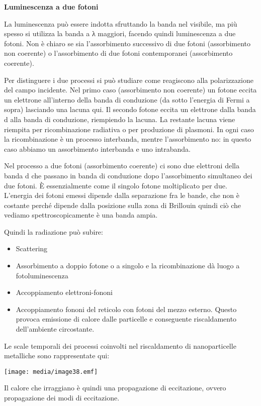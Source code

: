 \textbf{Luminescenza a due fotoni}

La luminescenza può essere indotta sfruttando la banda nel visibile, ma
più spesso si utilizza la banda a λ maggiori, facendo quindi
luminescenza a due fotoni. Non è chiaro se sia l'assorbimento successivo
di due fotoni (assorbimento non coerente) o l'assorbimento di due fotoni
contemporanei (assorbimento coerente).

Per distinguere i due processi si può studiare come reagiscono alla
polarizzazione del campo incidente. Nel primo caso (assorbimento non
coerente) un fotone eccita un elettrone all'interno della banda di
conduzione (da sotto l'energia di Fermi a sopra) lasciando una lacuna
qui. Il secondo fotone eccita un elettrone dalla banda d alla banda di
conduzione, riempiendo la lacuna. La restante lacuna viene riempita per
ricombinazione radiativa o per produzione di plasmoni. In ogni caso la
ricombinazione è un processo interbanda, mentre l'assorbimento no: in
questo caso abbiamo un assorbimento interbanda e uno intrabanda.

Nel processo a due fotoni (assorbimento coerente) ci sono due elettroni
della banda d che passano in banda di conduzione dopo l'assorbimento
simultaneo dei due fotoni. È essenzialmente come il singolo fotone
moltiplicato per due. L'energia dei fotoni emessi dipende dalla
separazione fra le bande, che non è costante perché dipende dalla
posizione sulla zona di Brillouin quindi ciò che vediamo
spettroscopicamente è una banda ampia.

Quindi la radiazione può subire:

\begin{itemize}
\item
  Scattering
\item
  Assorbimento a doppio fotone o a singolo e la ricombinazione dà luogo
  a fotoluminescenza
\item
  Accoppiamento elettroni-fononi
\item
  Accoppiamento fononi del reticolo con fotoni del mezzo esterno. Questo
  provoca emissione di calore dalle particelle e conseguente
  riscaldamento dell'ambiente circostante.
\end{itemize}

Le scale temporali dei processi coinvolti nel riscaldamento di
nanoparticelle metalliche sono rappresentate qui:

\texttt{[image: media/image38.emf]}

Il calore che irraggiano è quindi una propagazione di eccitazione,
ovvero propagazione dei modi di eccitazione.

